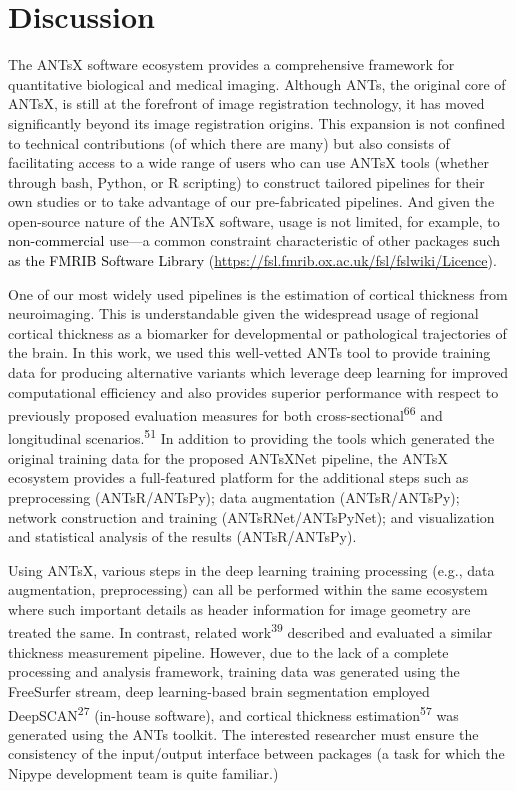 \documentclass[
  12pt,
]{article}
\begin{document}
\hypertarget{discussion}{%
\section*{Discussion}\label{discussion}}

The ANTsX software ecosystem provides a comprehensive framework for
quantitative biological and medical imaging. Although ANTs, the original
core of ANTsX, is still at the forefront of image registration
technology, it has moved significantly beyond its image registration
origins. This expansion is not confined to technical contributions (of
which there are many) but also consists of facilitating access to a wide
range of users who can use ANTsX tools (whether through bash, Python, or
R scripting) to construct tailored pipelines for their own studies or to
take advantage of our pre-fabricated pipelines. And given the
open-source nature of the ANTsX software, usage is not limited, for
example, to \textcolor{black}{non-commercial} use---a common constraint
characteristic of other packages
\textcolor{black}{such as the FMRIB Software Library}
(\url{https://fsl.fmrib.ox.ac.uk/fsl/fslwiki/Licence}).

One of our most widely used pipelines is the estimation of cortical
thickness from neuroimaging. This is understandable given the widespread
usage of regional cortical thickness as a biomarker for developmental or
pathological trajectories of the brain. In this work, we used this
well-vetted ANTs tool to provide training data for producing alternative
variants which leverage deep learning for improved computational
efficiency and also provides superior performance with respect to
previously proposed evaluation measures for both
cross-sectional\textsuperscript{66} and longitudinal
scenarios.\textsuperscript{51} In addition to providing the tools which
generated the original training data for the proposed ANTsXNet pipeline,
the ANTsX ecosystem provides a full-featured platform for the additional
steps such as preprocessing (ANTsR/ANTsPy); data augmentation
(ANTsR/ANTsPy); network construction and training (ANTsRNet/ANTsPyNet);
and visualization and statistical analysis of the results
(ANTsR/ANTsPy).

Using ANTsX, various steps in the deep learning training processing
(e.g., data augmentation, preprocessing) can all be performed within the
same ecosystem where such important details as header information for
image geometry are treated the same. In contrast, related
work\textsuperscript{39} described and evaluated a similar thickness
measurement pipeline. However, due to the lack of a complete processing
and analysis framework, training data was generated using the FreeSurfer
stream, deep learning-based brain segmentation employed
DeepSCAN\textsuperscript{27} (in-house software), and cortical thickness
estimation\textsuperscript{57} was generated using the ANTs toolkit. The
interested researcher must ensure the consistency of the input/output
interface between packages (a task for which the Nipype development team
is quite familiar.)
\end{document}
